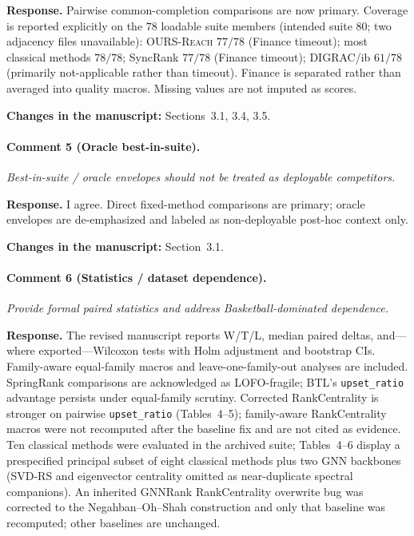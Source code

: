 \documentclass[11pt]{article}
\newcommand{\commentbox}[1]{\par\textit{#1}\par\medskip}
\newcommand{\changes}[1]{\textbf{Changes in the manuscript:} #1\par\medskip}
\begin{document}
\noindent\textbf{Response.}
Pairwise common-completion comparisons are now primary. Coverage is reported explicitly on the $78$ loadable suite members (intended suite $80$; two adjacency files unavailable): \textsc{OURS-Reach} $77/78$ (Finance timeout); most classical methods $78/78$; SyncRank $77/78$ (Finance timeout); DIGRAC/ib $61/78$ (primarily not-applicable rather than timeout). Finance is separated rather than averaged into quality macros. Missing values are not imputed as scores.

\changes{Sections~3.1, 3.4, 3.5.}

\paragraph{Comment 5 (Oracle best-in-suite).}
\commentbox{Best-in-suite / oracle envelopes should not be treated as deployable competitors.}

\noindent\textbf{Response.}
I agree. Direct fixed-method comparisons are primary; oracle envelopes are de-emphasized and labeled as non-deployable post-hoc context only.

\changes{Section~3.1.}

\paragraph{Comment 6 (Statistics / dataset dependence).}
\commentbox{Provide formal paired statistics and address Basketball-dominated dependence.}

\noindent\textbf{Response.}
The revised manuscript reports W/T/L, median paired deltas, and---where exported---Wilcoxon tests with Holm adjustment and bootstrap CIs. Family-aware equal-family macros and leave-one-family-out analyses are included. SpringRank comparisons are acknowledged as LOFO-fragile; BTL's \texttt{upset\_ratio} advantage persists under equal-family scrutiny. Corrected RankCentrality is stronger on pairwise \texttt{upset\_ratio} (Tables~4--5); family-aware RankCentrality macros were not recomputed after the baseline fix and are not cited as evidence. Ten classical methods were evaluated in the archived suite; Tables~4--6 display a prespecified principal subset of eight classical methods plus two GNN backbones (\textsc{SVD-RS} and eigenvector centrality omitted as near-duplicate spectral companions). An inherited GNNRank RankCentrality overwrite bug was corrected to the Negahban--Oh--Shah construction and only that baseline was recomputed; other baselines are unchanged.
\end{document}
